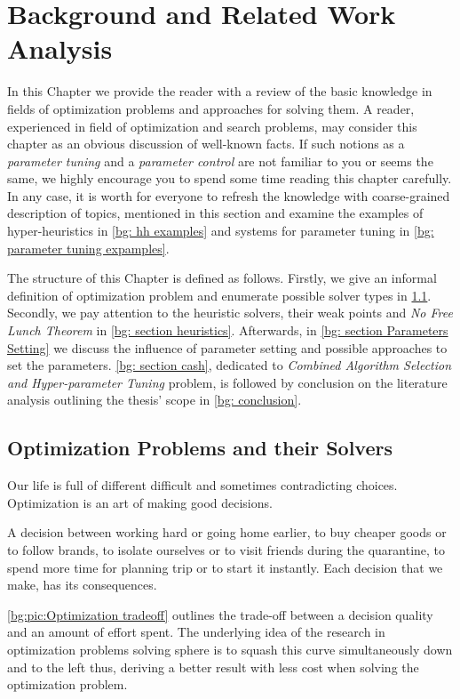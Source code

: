 \chapter{Background and Related Work Analysis}\label{bg}
In this Chapter we provide the reader with a review of the basic knowledge in fields of optimization problems and approaches for solving them.
A reader, experienced in field of optimization and search problems, may consider this chapter as an obvious discussion of well-known facts. 
If such notions as a \textit{parameter tuning} and a \textit{parameter control} are not familiar to you or seems the same, we highly encourage you to spend some time reading this chapter carefully.
In any case, it is worth for everyone to refresh the knowledge with coarse-grained description of topics, mentioned in this section and examine the examples of hyper-heuristics in \cref{bg: hh examples} and systems for parameter tuning in \cref{bg: parameter tuning expamples}.

The structure of this Chapter is defined as follows. Firstly, we give an informal definition of optimization problem and enumerate possible solver types in \cref{bg:section problems and solvers}. Secondly, we pay attention to the heuristic solvers, their weak points and \emph{No Free Lunch Theorem} in \cref{bg: section heuristics}. Afterwards, in \cref{bg: section Parameters Setting} we discuss the influence of parameter setting and possible approaches to set the parameters. \cref{bg: section cash}, dedicated to \emph{Combined Algorithm Selection and Hyper-parameter Tuning} problem, is followed by conclusion on the literature analysis outlining the thesis' scope in \cref{bg: conclusion}.

\section{Optimization Problems and their Solvers}\label{bg:section problems and solvers}
Our life is full of different difficult and sometimes contradicting choices. Optimization is an art of making good decisions.

A decision between working hard or going home earlier, to buy cheaper goods or to follow brands, to isolate ourselves or to visit friends during the quarantine, to spend more time for planning trip or to start it instantly. Each decision that we make, has its consequences.

\cref{bg:pic:Optimization tradeoff} outlines the trade-off between a decision quality and an amount of effort spent. The underlying idea of the research in optimization problems solving sphere is to squash this curve simultaneously down and to the left thus, deriving a better result with less cost when solving the optimization problem.

